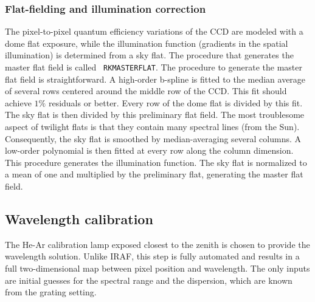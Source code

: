 \documentclass[12pt,preprint]{aastex}
\begin{document}
\subsubsection{Flat-fielding and illumination correction}\label{sec:flat}

The pixel-to-pixel quantum efficiency variations of the CCD are
modeled with a dome flat exposure, while the illumination function
(gradients in the spatial illumination) is determined from a sky flat.
The procedure that generates the master flat field is called {\tt
RKMASTERFLAT}.  The procedure to generate the master flat field is
straightforward.  A high-order b-spline is fitted to the median
average of several rows centered around the middle row of the CCD.
This fit should achieve $1\%$ residuals or better.  Every row of the
dome flat is divided by this fit.  The sky flat is then divided by
this preliminary flat field.  The most troublesome aspect of twilight
flats is that they contain many spectral lines (from the Sun).
Consequently, the sky flat is smoothed by median-averaging several
columns.  A low-order polynomial is then fitted at every row along the
column dimension.  This procedure generates the illumination
function.  The sky flat is normalized to a mean of one and multiplied
by the preliminary flat, generating the master flat field.


\subsection{Wavelength calibration}\label{sec:wave}

The He-Ar calibration lamp exposed closest to the zenith is chosen to
provide the wavelength solution.  Unlike IRAF, this step is fully
automated and results in a full two-dimensional map between pixel
position and wavelength.  The only inputs are initial guesses for the
spectral range and the dispersion, which are known from the grating
setting.  

\end{document}
